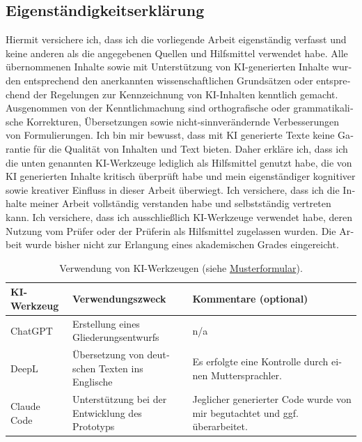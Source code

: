 \documentclass[
    pdftex,
    final,
    11pt,
    a4paper,
    parskip=false, %
    twoside, %
    footheight=0mm, %
    footinclude=false,
    toc=bibliography, %
    toc=listof %
]{scrbook} %
\begin{document}
\begin{appendices}

\begin{otherlanguage}{ngerman}
\chapter{Eigenständigkeitserklärung}
	
\vspace{1cm}
\noindent
Hiermit versichere ich, dass ich die vorliegende Arbeit eigenständig verfasst und keine anderen als die angegebenen Quellen und Hilfsmittel verwendet habe.
Alle übernommenen Inhalte sowie mit Unterstützung von KI-generierten Inhalte wurden entsprechend den anerkannten wissenschaftlichen Grundsätzen oder entsprechend der Regelungen zur Kennzeichnung von KI-Inhalten kenntlich gemacht.
Ausgenommen von der Kenntlichmachung sind orthografische oder grammatikalische Korrekturen, Übersetzungen sowie nicht-sinnverändernde Verbesserungen von Formulierungen.
Ich bin mir bewusst, dass mit KI generierte Texte keine Garantie für die Qualität von Inhalten und Text bieten.
Daher erkläre ich, dass ich die unten genannten KI-Werkzeuge lediglich als Hilfsmittel genutzt habe, die von KI generierten Inhalte kritisch überprüft habe und mein eigenständiger kognitiver sowie kreativer Einfluss in dieser Arbeit überwiegt.
Ich versichere, dass ich die Inhalte meiner Arbeit vollständig verstanden habe und selbstständig vertreten kann.
Ich versichere, dass ich ausschließlich KI-Werkzeuge verwendet habe, deren Nutzung vom Prüfer oder der Prüferin als Hilfsmittel zugelassen wurden.
Die Arbeit wurde bisher nicht zur Erlangung eines akademischen Grades eingereicht. 

\begin{table}[h!]
\centering
\begin{tabularx}{\linewidth}{|l|X|X|}
\hline
\textbf{KI-Werkzeug} & \textbf{Verwendungszweck} & \textbf{Kommentare (optional)} \\
\hline
ChatGPT & Erstellung eines Gliederungsentwurfs & n/a \\
\hline
DeepL & Übersetzung von deutschen Texten ins Englische & Es erfolgte eine Kontrolle durch einen Muttersprachler. \\ \hline
Claude Code & Unterstützung bei der Entwicklung des Prototyps & Jeglicher generierter Code wurde von mir begutachtet und ggf. überarbeitet. \\
\hline
\end{tabularx}
\caption{Verwendung von KI-Werkzeugen (siehe \href{https://backend.heiskills.uni-heidelberg.de/de/dokumente/ki-formular-de/download}{Musterformular}).}
\end{table}


\end{otherlanguage}
\end{appendices}
\end{document}
